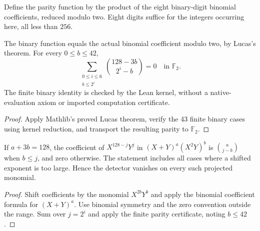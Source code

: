 \begin{definition}
  \label{def:h6-binary-binomial-parity}
  \leanok
  Define the parity function by the product of the eight binary-digit
  binomial coefficients, reduced modulo two. Eight digits suffice for
  the integers occurring here, all less than $256$.
\end{definition}

\begin{proposition}
  \label{prop:h6-binomial-parity-certificate}
  \leanok
  The binary function equals the actual binomial coefficient modulo two,
  by Lucas's theorem. For every $0\le b\le42$,
  \[
    \sum_{\substack{0\le i\le6\\b\le2^i}}
      {128-3b\choose 2^i-b}=0\quad\text{in }\mathbb F_2.
  \]
  The finite binary identity is checked by the Lean kernel, without a
  native-evaluation axiom or imported computation certificate.
\end{proposition}
\begin{proof}
  Apply Mathlib's proved Lucas theorem, verify the 43 finite binary
  cases using kernel reduction, and transport the resulting parity to
  $\mathbb F_2$.
  \leanok
\end{proof}

\begin{proposition}
  \label{prop:h6-cobar-detector-binomial}
  \leanok
  If $a+3b=128$, the coefficient of $X^{128-j}Y^j$ in
  $(X+Y)^a(X^2Y)^b$ is ${a\choose j-b}$ when $b\le j$, and zero otherwise.
  The statement includes all cases where a shifted exponent is too large.
  Hence the detector vanishes on every such projected monomial.
\end{proposition}
\begin{proof}
  Shift coefficients by the monomial $X^{2b}Y^b$ and apply the binomial
  coefficient formula for $(X+Y)^a$. Use binomial symmetry and the
  zero convention outside the range. Sum over $j=2^i$ and apply the
  finite parity certificate, noting $b\le42$.
  \leanok
\end{proof}


